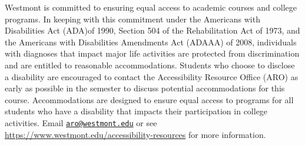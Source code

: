 \documentclass[
  twoside]{article}
\begin{document}
Westmont is committed to ensuring equal access to academic courses and
college programs. In keeping with this commitment under the Americans
with Disabilities Act (ADA)of 1990, Section 504 of the Rehabilitation
Act of 1973, and the Americans with Disabilities Amendments Act (ADAAA)
of 2008, individuals with diagnoses that impact major life activities
are protected from discrimination and are entitled to reasonable
accommodations. Students who choose to disclose a disability are
encouraged to contact the Accessibility Resource Office (ARO) as early
as possible in the semester to discuss potential accommodations for this
course. Accommodations are designed to ensure equal access to programs
for all students who have a disability that impacts their participation
in college activities. Email
\href{mailto:aro@westmont.edu}{\nolinkurl{aro@westmont.edu}} or see
\url{https://www.westmont.edu/accessibility-resources} for more
information.
\end{document}
